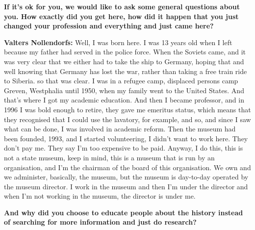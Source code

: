 \textbf{If it's ok for you, we would like to ask some general questions about you. How exactly did you get here, how did it happen that you just changed your profession and everything and just came here?}

\textbf{Valters Nollendorfs:} Well, I was born here. I was 13 years old when I left because my father had served in the police force. When the Soviets came, and it was very clear that we either had to take the ship to Germany, hoping that and well knowing that Germany has lost the war, rather than taking a free train ride to Siberia. so that was clear. I was in a refugee camp, displaced persons camp Greven, Westphalia until 1950, when my family went to the United States. And that's where I got my academic education. And then I became professor, and in 1996 I was bold enough to retire, they gave me emeritus status, which means that they recognised that I could use the lavatory, for example, and so, and since I saw what can be done, I was involved in academic reform. Then the museum had been founded, 1993, and I started volunteering, I didn't want to work here. They don't pay me. 
They say I’m too expensive to be paid. Anyway, I do this, this is not a state museum, keep in mind, this is a museum that is run by an organisation, and I'm the chairman of the board of this organisation. We own and we administer, basically, the museum, but the museum is day-to-day operated by the museum director. I work in the museum and then I'm under the director and when I'm not working in the museum, the director is under me.

\textbf{And why did you choose to educate people about the history instead of searching for more information and just do research?}

